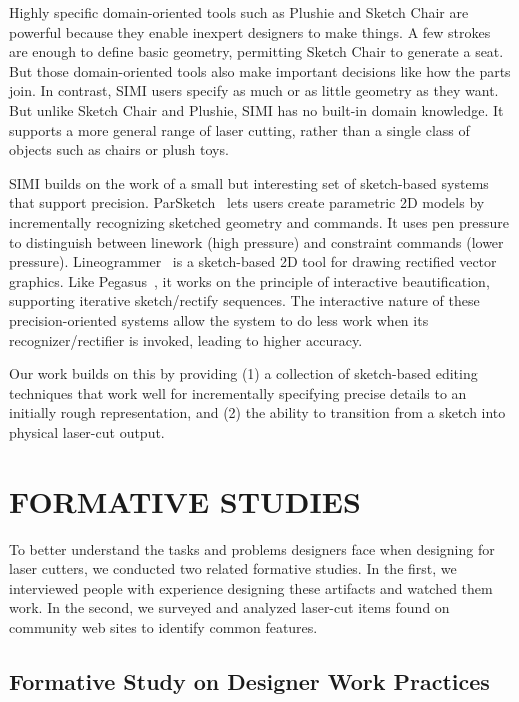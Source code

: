 \documentclass{article}
\begin{document}
Highly specific domain-oriented tools such as Plushie and Sketch Chair
are powerful because they enable inexpert designers to make things. A
few strokes are enough to define basic geometry, permitting Sketch
Chair to generate a seat. But those domain-oriented tools also make
important decisions like how the parts join. In contrast, SIMI users
specify as much or as little geometry as they want. But unlike Sketch
Chair and Plushie, SIMI has no built-in domain knowledge. It supports
a more general range of laser cutting, rather than a single class of
objects such as chairs or plush toys.

SIMI builds on the work of a small but interesting set of sketch-based
systems that support precision.  ParSketch~\cite{naya-parsketch} lets
users create parametric 2D models by incrementally recognizing
sketched geometry and commands. It uses pen pressure to distinguish
between linework (high pressure) and constraint commands (lower
pressure). Lineogrammer~\cite{zeleznik-lineogrammer} is a sketch-based
2D tool for drawing rectified vector graphics. Like
Pegasus~\cite{igarashi-pegasus}, it works on the principle of
interactive beautification, supporting iterative sketch/rectify
sequences. The interactive nature of these precision-oriented systems
allow the system to do less work when its recognizer/rectifier is
invoked, leading to higher accuracy.

Our work builds on this by providing (1) a collection of sketch-based
editing techniques that work well for incrementally specifying precise
details to an initially rough representation, and (2) the ability to
transition from a sketch into physical laser-cut output.

\section{FORMATIVE STUDIES}

To better understand the tasks and problems designers face when
designing for laser cutters, we conducted two related formative
studies.  In the first, we interviewed people with experience
designing these artifacts and watched them work. In the second, we
surveyed and analyzed laser-cut items found on community web sites to
identify common features.

\subsection{Formative Study on Designer Work Practices}
\label{sec:formative}
\end{document}
